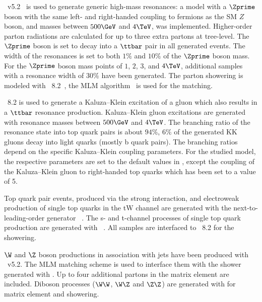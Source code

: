 
\MADGRAPH~v5.2~\cite{Alwall:2014hca} is used to generate generic high-mass resonances:
a model with a $\Zprime$ boson with
the same left- and right-handed coupling to fermions as the SM $Z$ boson,
and masses between $500\GeV$ and $4\TeV$, was implemented.
Higher-order parton radiations are calculated 
for up to three extra partons at tree-level.
The $\Zprime$ boson is set to decay into
a $\ttbar$ pair in all generated events.
The width of the resonances is set to
both $1\%$ and $10\%$ of the $\Zprime$ boson mass.
For the $\Zprime$ boson mass points of $1$, $2$, $3$, and $4\TeV$,
additional samples with a resonance width of $30\%$ have been generated.
The parton showering is modeled with \PYTHIA~8.2~\cite{Sjostrand:2006za,Sjostrand:2014zea},
the MLM algorithm~\cite{mlm} is used for the matching. 

\PYTHIA~8.2 is used to generate a
Kaluza--Klein excitation of a gluon
which also results in a $\ttbar$ resonance production. 
Kaluza--Klein gluon excitations are generated with resonance masses between $500\GeV$ and $4\TeV$.
The branching ratio of the resonance state into top quark pairs is about $94\%$,
$6\%$ of the generated KK gluons decay into light quarks (mostly b quark pairs).
The branching ratios depend on the specific Kaluza--Klein coupling parameters. 
For the studied model, the respective \PYTHIA parameters are set to
the default values in \PYTHIA,
except the coupling of the Kaluza--Klein gluon
to right-handed top quarks which has been set to a value of 5.

Top quark pair events, produced via the strong interaction,
and electroweak production of single top quarks in the tW channel
are generated with the next-to-leading-order generator
\POWHEG~\cite{Nason:2004rx,Frixione:2007vw,Alioli:2010xd,Frixione:2007nw,Re:2010bp}.
The s- and t-channel processes of single top quark production
are generated with \aMCATNLO~\cite{Alwall:2014hca}.
All samples are interfaced to \PYTHIA~8.2 for the showering. 

$\W$ and $\Z$ boson productions in association with jets have been produced with \MADGRAPH~v5.2.
The MLM matching scheme is used to interface them with the shower generated with \PYTHIA.
Up to four additional partons in the matrix element are included.
Diboson processes ($\W\W$, $\W\Z$ and $\Z\Z$) are generated
with \PYTHIA for matrix element and showering.

